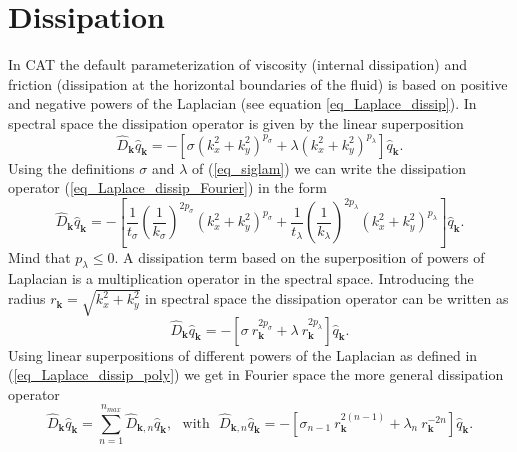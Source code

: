 \section{Dissipation} 
%
\label{ssec_Dschemes}
In CAT the default parameterization of viscosity (internal dissipation) 
and friction (dissipation at the horizontal boundaries of the fluid) 
is based on positive and negative powers of the Laplacian 
(see equation \ref{eq_Laplace_dissip}). In spectral space the dissipation
operator is given by the linear superposition
\begin{equation} \label{eq_Laplace_dissip_Fourier}
   \hat{D}_{\mathbf{k}}  \hat{q}_{\mathbf{k}}
    = - \left[
         \sigma \left(k_{x}^{2} + k_{y}^{2} \right)^{p_{\sigma}}
            + 
         \lambda \left(k_{x}^{2} + k_{y}^{2} \right)^{p_{\lambda}}
        \right]
        \hat{q}_{\mathbf{k}}.
\end{equation}
Using the definitions $\sigma$ and $\lambda$ of (\ref{eq_siglam})
we can write the dissipation operator (\ref{eq_Laplace_dissip_Fourier})
in the form
\begin{equation} \label{eq_Laplace_dissip_Fourier2}
   \hat{D}_{\mathbf{k}}  \hat{q}_{\mathbf{k}}
    = - \left[
         \frac{1}{t_{\sigma}} 
         \left(\frac{1}{k_{\sigma}}\right)^{2 p_{\sigma}}  
         \left(k_{x}^{2} + k_{y}^{2} \right)^{p_{\sigma}}
          + 
         \frac{1}{t_{\lambda}} 
         \left(\frac{1}{k_{\lambda}}\right)^{2 p_{\lambda}}
         \left(k_{x}^{2} + k_{y}^{2} \right)^{p_{\lambda}}
        \right]
        \hat{q}_{\mathbf{k}}.
\end{equation}
Mind that $p_{\lambda} \le 0$. A dissipation term based on
the superposition of powers of Laplacian is a multiplication
operator in the spectral space. Introducing the radius 
$r_{\mathbf{k}} = \sqrt{k^{2}_{x} + k^{2}_{y}}$ in spectral space 
the dissipation operator can be written as  
\begin{equation} \label{eq_Laplace_dissip_Fourier3}
   \hat{D}_{\mathbf{k}}  \hat{q}_{\mathbf{k}}
    = 
   - \left[
       \sigma \ r^{2 p_{\sigma}}_{\mathbf{k}}
        +
       \lambda \ r^{2 p_{\lambda}}_{\mathbf{k}}
    \right]  
     \hat{q}_{\mathbf{k}}.
\end{equation}     
Using linear superpositions of different powers of the Laplacian as
defined in (\ref{eq_Laplace_dissip_poly}) we get in Fourier space
the more general dissipation operator
\begin{equation} \label{eq_Laplace_dissip_poly_Fourier}
  \hat{D}_{\mathbf{k}}  \hat{q}_{\mathbf{k}}
   =
  \sum_{n=1}^{n_{max}} \hat{D}_{\mathbf{k},n}  \hat{q}_{\mathbf{k}},
  \ \ \ \mbox{with} \ \ \ 
  \hat{D}_{\mathbf{k},n}  \hat{q}_{\mathbf{k}}
   =
   - \left[
        \sigma_{n-1} \ r^{2 (n-1)}_{\mathbf{k}}
         +
        \lambda_{n} \ r^{-2n}_{\mathbf{k}}
       \right] 
     \hat{q}_{\mathbf{k}}.
\end{equation}
